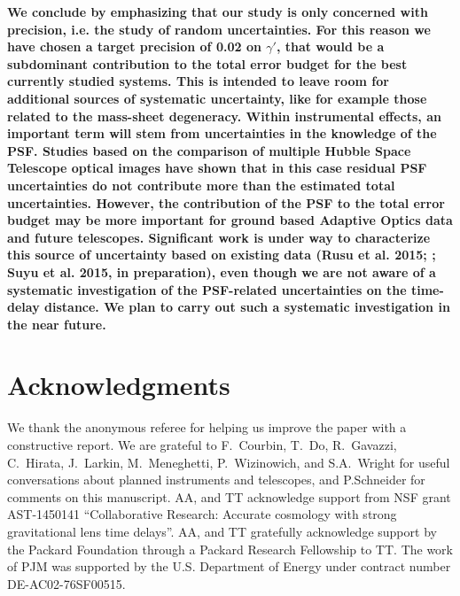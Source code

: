 \documentclass[a4paper,11pt]{article}
\begin{document}
{\bf We conclude by emphasizing that our study is only concerned with
precision, i.e. the study of random uncertainties. For this reason we
have chosen a target precision of 0.02 on $\gamma'$, that would be a
subdominant contribution to the total error budget for the best
currently studied systems. This is intended to leave room for
additional sources of systematic uncertainty, like for example those
related to the mass-sheet degeneracy. Within instrumental effects, an
important term will stem from uncertainties in the knowledge of the
PSF. Studies based on the comparison of multiple Hubble Space
Telescope optical images have shown that in this case residual PSF
uncertainties do not contribute more than the estimated total
uncertainties. However, the contribution of the PSF to the total error
budget may be more important for ground based Adaptive Optics data and
future telescopes. Significant work is under way to characterize this
source of uncertainty based on existing data (Rusu et al. 2015;
\cite{2015arXiv150605147R}; Suyu et al. 2015, in preparation), even
though we are not aware of a systematic investigation of the
PSF-related uncertainties on the time-delay distance. We plan to carry
out such a systematic investigation in the near future.}

\section*{Acknowledgments}

We thank the anonymous referee for helping us improve the paper with a
constructive report.  We are grateful to F.~Courbin, T.~Do,
R.~Gavazzi, C.~Hirata, J.~Larkin, M.~Meneghetti, P.~Wizinowich, and
S.A.~Wright for useful conversations about planned instruments and
telescopes, and P.Schneider for comments on this manuscript. AA, and
TT acknowledge support from NSF grant AST-1450141 ``Collaborative
Research: Accurate cosmology with strong gravitational lens time
delays''. AA, and TT gratefully acknowledge support by the Packard
Foundation through a Packard Research Fellowship to TT.  The work of
PJM was supported by the U.S.  Department of Energy under contract
number DE-AC02-76SF00515.\\




\end{document}
